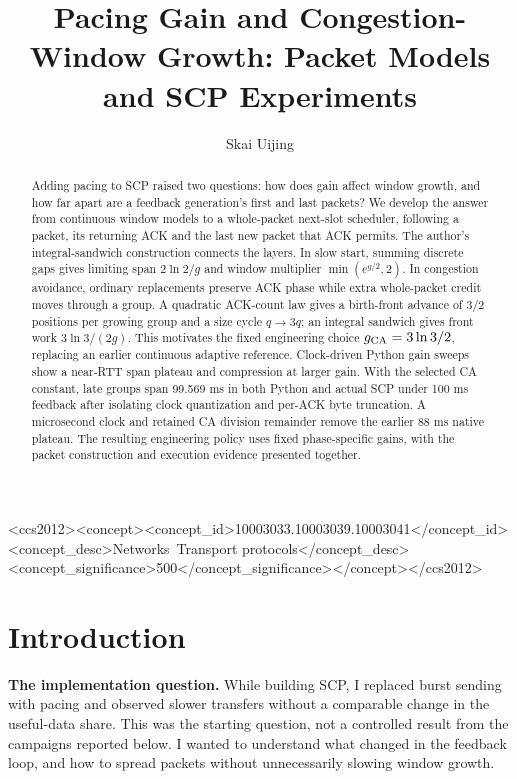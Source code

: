 \documentclass[sigconf,nonacm]{acmart}
\title{Pacing Gain and Congestion-Window Growth: Packet Models and SCP Experiments}
\author{Skai Uijing}
\affiliation{\institution{Independent Researcher}\country{China}}
\begin{document}
\begin{abstract}
Adding pacing to SCP raised two questions: how does gain affect window
growth, and how far apart are a feedback generation's first and last
packets? We develop the answer from continuous window models to a
whole-packet next-slot scheduler, following a packet, its returning ACK
and the last new packet that ACK permits. The author's integral-sandwich
construction connects the layers. In slow start, summing discrete gaps
gives limiting span $2\ln2/g$ and window multiplier $\min(e^{g/2},2)$.
In congestion avoidance, ordinary replacements preserve ACK phase while
extra whole-packet credit moves through a group. A quadratic ACK-count
law gives a birth-front advance of $3/2$ positions per growing group and
a size cycle $q\to3q$; an integral sandwich gives front work
$3\ln3/(2g)$. This motivates the fixed engineering choice
$g_{\rm CA}=3\ln3/2$, replacing an earlier continuous adaptive reference.
Clock-driven Python gain sweeps show a near-RTT span plateau and
compression at larger gain. With the selected CA constant, late groups
span 99.569 ms in both Python and actual SCP under 100 ms feedback after
isolating clock quantization and per-ACK byte truncation. A microsecond
clock and retained CA division remainder remove the earlier 88 ms
native plateau. The resulting engineering policy
uses fixed phase-specific gains, with the packet construction and
execution evidence presented together.
\end{abstract}
\begin{CCSXML}
<ccs2012><concept><concept_id>10003033.10003039.10003041</concept_id><concept_desc>Networks~Transport protocols</concept_desc><concept_significance>500</concept_significance></concept></ccs2012>
\end{CCSXML}
\maketitle
{}
\pagestyle{standardpagestyle}

\section{Introduction}
\textbf{The implementation question.} While building SCP, I replaced burst sending with pacing and observed slower transfers without a comparable change in the useful-data share. This was the starting question, not a controlled result from the campaigns reported below. I wanted to understand what changed in the feedback loop, and how to spread packets without unnecessarily slowing window growth.
\end{document}
